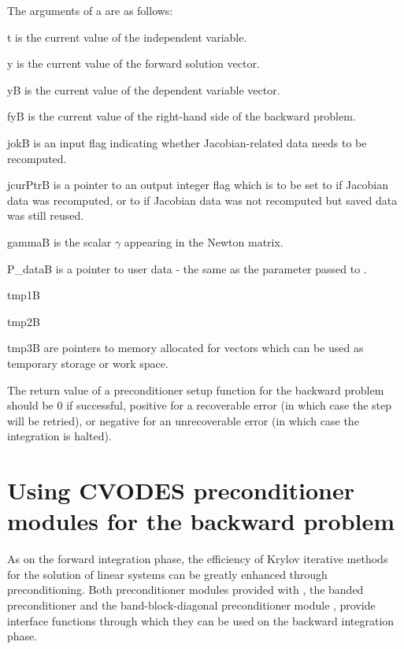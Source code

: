 {
  The arguments of a  are as follows:
  \begin{args}[jcurPtrB]
  \item[t]
    is the current value of the independent variable.
  \item[y]
    is the current value of the forward solution vector.
  \item[yB]
    is the current value of the dependent variable vector.
  \item[fyB]
    is the current value of the right-hand side of the backward problem.
  \item[jokB]
    is an input flag indicating whether Jacobian-related   
    data needs to be recomputed.
  \item[jcurPtrB]
    is a pointer to an output integer flag which is        
    to be set to  if Jacobian data was recomputed, or   
    to  if Jacobian data was not recomputed but saved data was still reused.
  \item[gammaB]
    is the scalar $\gamma$ appearing in the Newton matrix.
  \item[P\_dataB]
    is a pointer to user data - the same as the       
    parameter passed to .
  \item[tmp1B]
  \item[tmp2B]
  \item[tmp3B]
    are pointers to memory allocated for vectors which can be used           
    as temporary storage or work space.    
  \end{args}
}
{
  The return value of a preconditioner setup function for the backward
  problem should be $0$ if successful, 
  positive for a recoverable error (in which case the step will be retried),     
  or negative for an unrecoverable error (in which case the integration is halted).
}
{}

\section{Using CVODES preconditioner modules for the backward problem}

As on the forward integration phase, the efficiency of Krylov iterative methods 
for the solution of linear systems can be greatly enhanced through preconditioning.
Both preconditioner modules provided with {\sundials}, the banded
preconditioner {\cvbandpre} and the band-block-diagonal preconditioner module {\cvbbdpre},
provide interface functions through which they can be used on the backward integration phase.

